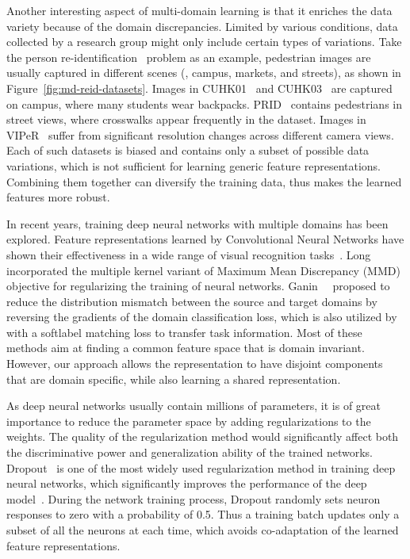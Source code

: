 Another interesting aspect of multi-domain learning is that it enriches the data variety because of the domain discrepancies. Limited by various conditions, data collected by a research group might only include certain types of variations. Take the person re-identification~\cite{ajakan2014domain,li2014deepreid} problem as an example, pedestrian images are usually captured in different scenes (\eg, campus, markets, and streets), as shown in Figure~\ref{fig:md-reid-datasets}. Images in CUHK01~\cite{li2013locally} and CUHK03~\cite{li2014deepreid} are captured on campus, where many students wear backpacks. PRID~\cite{hirzer11a} contains pedestrians in street views, where crosswalks appear frequently in the dataset. Images in VIPeR~\cite{gray2007evaluating} suffer from significant resolution changes across different camera views. Each of such datasets is biased and contains only a subset of possible data variations, which is not sufficient for learning generic feature representations. Combining them together can diversify the training data, thus makes the learned features more robust.

In recent years, training deep neural networks with multiple domains has been explored. Feature representations learned by Convolutional Neural Networks have shown their effectiveness in a wide range of visual recognition tasks~\cite{krizhevsky2012imagenet,girshick2014rich,long2015fully,chu2016structured,yang2016end,kang2016object}. Long~\etal~\cite{long2015learning} incorporated the multiple kernel variant of Maximum Mean Discrepancy (MMD) objective for regularizing the training of neural networks. Ganin~\etal~\cite{ganin2014unsupervised} proposed to reduce the distribution mismatch between the source and target domains by reversing the gradients of the domain classification loss, which is also utilized by~\cite{tzeng2015simultaneous} with a softlabel matching loss to transfer task information. Most of these methods aim at finding a common feature space that is domain invariant. However, our approach allows the representation to have disjoint components that are domain specific, while also learning a shared representation.

As deep neural networks usually contain millions of parameters, it is of great importance to reduce the parameter space by adding regularizations to the weights. The quality of the regularization method would significantly affect both the discriminative power and generalization ability of the trained networks. Dropout~\cite{hinton2012improving} is one of the most widely used regularization method in training deep neural networks, which significantly improves the performance of the deep model~\cite{krizhevsky2012imagenet}. During the network training process, Dropout randomly sets neuron responses to zero with a probability of 0.5. Thus a training batch updates only a subset of all the neurons at each time, which avoids co-adaptation of the learned feature representations.

